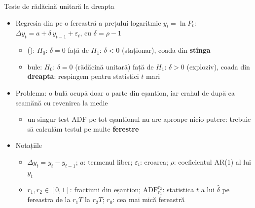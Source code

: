 \begin{frame}{Teste de rădăcină unitară la dreapta}
\itemsize{\footnotesize}
\begin{itemize}
    \item Regresia din  pe o fereastră a prețului logaritmic $y_t = \ln P_t$: $\Delta y_t = a + \delta\, y_{t-1} + \varepsilon_t$, cu $\delta = \rho - 1$
    \begin{itemize}
        \item {} (): $H_0$: $\delta = 0$ față de $H_1$: $\delta < 0$ (staționar), coada din \textbf{stînga}
        \item bule: $H_0$: $\delta = 0$ (rădăcină unitară) față de $H_1$: $\delta > 0$ (exploziv), coada din \textbf{dreapta}: respingem pentru statistici $t$ mari
    \end{itemize}
    \item Problema: o bulă ocupă doar o parte din eșantion, iar crahul de după ea seamănă cu revenirea la medie
    \begin{itemize}
        \item un singur test ADF pe tot eșantionul nu are aproape nicio putere: trebuie să calculăm testul pe multe \textbf{ferestre}
    \end{itemize}
    \item Notațiile
    \begin{itemize}
        \item $\Delta y_t = y_t - y_{t-1}$; $a$: termenul liber; $\varepsilon_t$: eroarea; $\rho$: coeficientul AR(1) al lui $y_t$
        \item $r_1, r_2 \in [0,1]$: fracțiuni din eșantion; $\mathrm{ADF}_{r_1}^{r_2}$: statistica $t$ a lui $\hat\delta$ pe fereastra de la $r_1T$ la $r_2T$; $r_0$: cea mai mică fereastră
    \end{itemize}
\end{itemize}
\end{frame}

